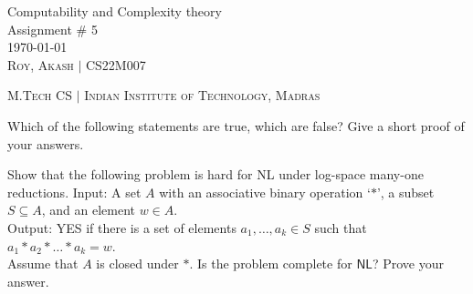 \documentclass[12pt,a4, onecolumn]{exam}
\newcommand{\NL}{\ensuremath{\mathsf{NL}}}
\begin{document}
\begingroup  
    \centering
    \LARGE Computability and Complexity theory\\
    \LARGE Assignment \# 5\\[0.5em]
    \large \today\\[0.5em]
    \large \textsc{Roy, Akash} $\mid$ CS22M007\par
    \large \textsc{M.Tech CS} $\mid$ \textsc{Indian Institute of Technology, Madras}\par
\endgroup
\pointsdroppedatright   %
\printanswers
\renewcommand{\solutiontitle}{\noindent\textbf{Ans:}\enspace}   %

\begin{questions}

    \question Which of the following statements are true, which are false? Give a short proof of your answers.
    

    \question Show that the following problem  is hard for {\sf NL} under log-space many-one reductions. Input: A set $A$ with an associative binary operation `$*$', a subset $S\subseteq A$, and an element $w\in A$.\\
    Output: YES if there is a set of elements $a_1, \ldots, a_k\in S$ such that $a_1*a_2*\ldots * a_k= w$.\\
    Assume that $A$ is closed under $*$. Is the problem complete for $\NL$? Prove your answer.


\end{questions}
\end{document}
